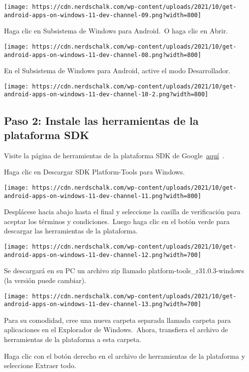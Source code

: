 \documentclass[
  letterpaper,
]{article}
\begin{document}
\texttt{[image: https://cdn.nerdschalk.com/wp-content/uploads/2021/10/get-android-apps-on-windows-11-dev-channel-09.png?width=800]}

Haga clic en Subsistema de Windows para Android.~O haga clic en Abrir.

\texttt{[image: https://cdn.nerdschalk.com/wp-content/uploads/2021/10/get-android-apps-on-windows-11-dev-channel-08.png?width=800]}

En el Subsistema de Windows para Android, active el modo Desarrollador.

\texttt{[image: https://cdn.nerdschalk.com/wp-content/uploads/2021/10/get-android-apps-on-windows-11-dev-channel-10-2.png?width=800]}

\hypertarget{paso-2-instale-las-herramientas-de-la-plataforma-sdk}{%
\subsection{Paso 2: Instale las herramientas de la plataforma
SDK}\label{paso-2-instale-las-herramientas-de-la-plataforma-sdk}}

Visite la página de herramientas de la plataforma SDK de
Google~\href{https://developer.android.com/studio/releases/platform-tools.html}{aquí}~.

Haga clic en Descargar SDK Platform-Tools para Windows.

\texttt{[image: https://cdn.nerdschalk.com/wp-content/uploads/2021/10/get-android-apps-on-windows-11-dev-channel-11.png?width=800]}

Desplácese hacia abajo hasta el final y seleccione la casilla de
verificación para aceptar los términos y condiciones.~Luego haga clic en
el botón verde para descargar las herramientas de la plataforma.

\texttt{[image: https://cdn.nerdschalk.com/wp-content/uploads/2021/10/get-android-apps-on-windows-11-dev-channel-12.png?width=700]}

Se descargará en su PC un archivo zip llamado
platform-tools\_r31.0.3-windows (la versión puede cambiar).

\texttt{[image: https://cdn.nerdschalk.com/wp-content/uploads/2021/10/get-android-apps-on-windows-11-dev-channel-13.png?width=700]}

Para su comodidad, cree una nueva carpeta separada llamada carpeta para
aplicaciones en el Explorador de Windows.~Ahora, transfiera el archivo
de herramientas de la plataforma a esta carpeta.

Haga clic con el botón derecho en el archivo de herramientas de la
plataforma y seleccione Extraer todo.
\end{document}
